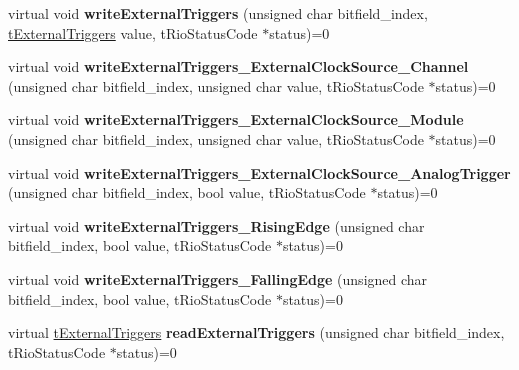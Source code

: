 \begin{DoxyCompactItemize}
\item 
\hypertarget{classnFPGA_1_1nFRC__2012__1__6__4_1_1tDMA_abc26cd73a747335fc6cb5ec1a381c9de}{
virtual void {\bfseries writeExternalTriggers} (unsigned char bitfield\_\-index, \hyperlink{unionnFPGA_1_1nFRC__2012__1__6__4_1_1tDMA_1_1tExternalTriggers}{tExternalTriggers} value, tRioStatusCode $\ast$status)=0}
\label{classnFPGA_1_1nFRC__2012__1__6__4_1_1tDMA_abc26cd73a747335fc6cb5ec1a381c9de}

\item 
\hypertarget{classnFPGA_1_1nFRC__2012__1__6__4_1_1tDMA_afe7e732febdb71445a076dcc3861efe5}{
virtual void {\bfseries writeExternalTriggers\_\-ExternalClockSource\_\-Channel} (unsigned char bitfield\_\-index, unsigned char value, tRioStatusCode $\ast$status)=0}
\label{classnFPGA_1_1nFRC__2012__1__6__4_1_1tDMA_afe7e732febdb71445a076dcc3861efe5}

\item 
\hypertarget{classnFPGA_1_1nFRC__2012__1__6__4_1_1tDMA_a80dc57fd667dad73d7f09868ab8eff8e}{
virtual void {\bfseries writeExternalTriggers\_\-ExternalClockSource\_\-Module} (unsigned char bitfield\_\-index, unsigned char value, tRioStatusCode $\ast$status)=0}
\label{classnFPGA_1_1nFRC__2012__1__6__4_1_1tDMA_a80dc57fd667dad73d7f09868ab8eff8e}

\item 
\hypertarget{classnFPGA_1_1nFRC__2012__1__6__4_1_1tDMA_ad14f2cd25a6b67843cea66860bf81a4f}{
virtual void {\bfseries writeExternalTriggers\_\-ExternalClockSource\_\-AnalogTrigger} (unsigned char bitfield\_\-index, bool value, tRioStatusCode $\ast$status)=0}
\label{classnFPGA_1_1nFRC__2012__1__6__4_1_1tDMA_ad14f2cd25a6b67843cea66860bf81a4f}

\item 
\hypertarget{classnFPGA_1_1nFRC__2012__1__6__4_1_1tDMA_a3e3bf65ebc96483206ff11e16bbe5763}{
virtual void {\bfseries writeExternalTriggers\_\-RisingEdge} (unsigned char bitfield\_\-index, bool value, tRioStatusCode $\ast$status)=0}
\label{classnFPGA_1_1nFRC__2012__1__6__4_1_1tDMA_a3e3bf65ebc96483206ff11e16bbe5763}

\item 
\hypertarget{classnFPGA_1_1nFRC__2012__1__6__4_1_1tDMA_a07de0de28f6b3eac7f9b3137401ffdde}{
virtual void {\bfseries writeExternalTriggers\_\-FallingEdge} (unsigned char bitfield\_\-index, bool value, tRioStatusCode $\ast$status)=0}
\label{classnFPGA_1_1nFRC__2012__1__6__4_1_1tDMA_a07de0de28f6b3eac7f9b3137401ffdde}

\item 
\hypertarget{classnFPGA_1_1nFRC__2012__1__6__4_1_1tDMA_a8cb27bda7a3d3aeb48466d31a35718f6}{
virtual \hyperlink{unionnFPGA_1_1nFRC__2012__1__6__4_1_1tDMA_1_1tExternalTriggers}{tExternalTriggers} {\bfseries readExternalTriggers} (unsigned char bitfield\_\-index, tRioStatusCode $\ast$status)=0}
\label{classnFPGA_1_1nFRC__2012__1__6__4_1_1tDMA_a8cb27bda7a3d3aeb48466d31a35718f6}


\end{DoxyCompactItemize}
